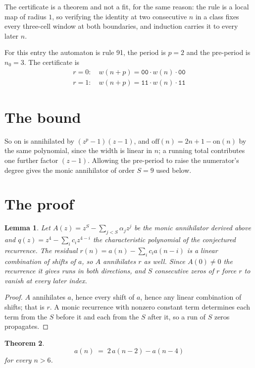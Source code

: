 \documentclass[11pt,a4paper]{article}
\theoremstyle{plain}
\newtheorem{theorem}{Theorem}
\newtheorem{lemma}[theorem]{Lemma}
\theoremstyle{definition}
\begin{document}
The certificate is a theorem and not a fit, for the same reason: the rule is a local map of
radius $1$, so verifying the identity at two consecutive $n$ in a class fixes every three-cell
window at both boundaries, and induction carries it to every later $n$.

For this entry the automaton is rule 91, the period is $p=2$ and the pre-period is $n_0=3$.
The certificate is
\begin{gather*}
r=0:\quad w(n+p) = \texttt{00} \cdot w(n) \cdot \texttt{00} \\
r=1:\quad w(n+p) = \texttt{11} \cdot w(n) \cdot \texttt{11}
\end{gather*}

\section{The bound}

So
$\mathrm{on}$ is annihilated by $(z^p-1)(z-1)$, and $\mathrm{off}(n)=2n+1-\mathrm{on}(n)$ by
the same polynomial, since the width is linear in $n$; a running total contributes one further
factor $(z-1)$. Allowing the pre-period to raise the numerator's degree gives the monic
annihilator of order $S=9$ used below.

\section{The proof}

\begin{lemma}\label{lem:crit}
Let $A(z)=z^S-\sum_{j<S}\alpha_jz^{j}$ be the monic annihilator derived above and
$q(z)=z^{4}-\sum_ic_iz^{4-i}$ the characteristic polynomial of the conjectured
recurrence. The residual $r(n)=a(n)-\sum_ic_ia(n-i)$ is a linear combination of shifts of $a$,
so $A$ annihilates $r$ as well. Since $A(0)\ne0$ the recurrence it gives runs in both
directions, and $S$ consecutive zeros of $r$ force $r$ to vanish at every later index.
\end{lemma}

\begin{proof}
$A$ annihilates $a$, hence every shift of $a$, hence any linear combination of shifts; that is
$r$. A monic recurrence with nonzero constant term determines each term from the $S$ before it
and each from the $S$ after it, so a run of $S$ zeros propagates.
\end{proof}

\begin{theorem}
\[
a(n)\;=\;2\,a(n-2) - a(n-4)
\]
for every $n>6$.
\end{theorem}
\end{document}
